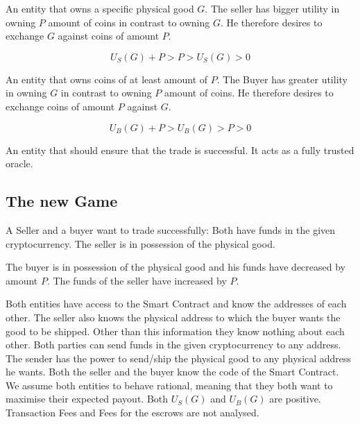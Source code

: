 \documentclass{cacthesis}
\begin{document}
An entity that owns a specific physical good $G$. The seller has bigger utility in owning $P$ amount of coins in contrast to owning $G$. He therefore desires to exchange $G$ against coins of amount $P$.

\begin{equation}
    U_S(G) + P > P > U_S(G) > 0
\end{equation}

An entity that owns coins of at least amount of $P$. The Buyer has greater utility in owning $G$ in contrast to  owning $P$ amount of coins. He therefore desires to exchange coins of amount $P$ against $G$.

\begin{equation}
    U_B(G) + P > U_B(G) > P > 0
\end{equation}

 An entity that should ensure that the trade is successful. It acts as a fully trusted oracle.


\subsection{The new Game}

A Seller and a buyer want to trade successfully: Both have funds in the given cryptocurrency. The seller is in possession of the physical good.

The buyer is in possession of the physical good and his funds have decreased by amount $P$. The funds of the seller have increased by $P$.

Both entities have access to the Smart Contract and know the addresses of each other. The seller also knows the physical address to which the buyer wants the good to be shipped. Other than this information they know nothing about each other.\newline 
Both parties can send funds in the given cryptocurrency to any address. The sender has the power to send/ship the physical good to any physical address he wants. Both the seller and the buyer know the code of the Smart Contract.\newline
We assume both entities to behave rational, meaning that they both want to maximise their expected payout.\newline
Both $U_S(G)$ and $U_B(G)$ are positive. \newline
Transaction Fees and Fees for the escrows are not analysed.
\end{document}

